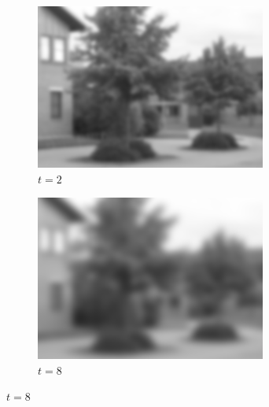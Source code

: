 \documentclass[a4paper,12pt]{article}
\begin{document}
\begin{figure}[H]
    \begin{subfigure}[b]{0.4\linewidth}
    \includegraphics[width=\linewidth]{Scalespace2.png}
    \caption{$t=2$}
    \end{subfigure}
    \begin{subfigure}[b]{0.4\linewidth}
    \includegraphics[width=\linewidth]{Scalespace3.png}
    \caption{$t=8$}
    \end{subfigure}


\end{figure}
\end{document}
